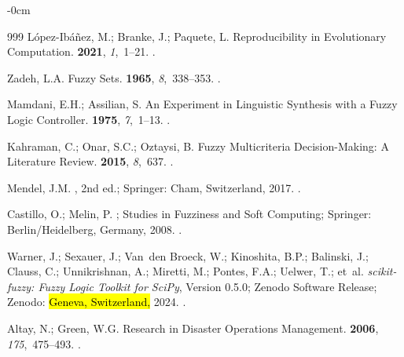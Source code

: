 \documentclass[systems,article,accept,moreauthors,pdftex]{Definitions/mdpi}
\begin{document}
\begin{adjustwidth}{-\extralength}{0cm}
\begin{thebibliography}{999}
L{\'o}pez-Ib{\'a}{\~n}ez, M.; Branke, J.; Paquete, L.
\newblock Reproducibility in Evolutionary Computation.
 {\bf
  2021}, {\em 1},~1--21.
.

Zadeh, L.A.
\newblock Fuzzy Sets.
 {\bf 1965}, {\em 8},~338--353.
.

Mamdani, E.H.; Assilian, S.
\newblock An Experiment in Linguistic Synthesis with a Fuzzy Logic Controller.
 {\bf 1975}, {\em
  7},~1--13.
.

Kahraman, C.; Onar, S.C.; Oztaysi, B.
\newblock Fuzzy Multicriteria Decision-Making: A Literature Review.
  {\bf 2015}, {\em 8},~637.
.

Mendel, J.M.
, 2nd ed.; Springer: Cham, Switzerland,  2017.
.

Castillo, O.; Melin, P.
; Studies in
  Fuzziness and Soft Computing; Springer: Berlin/Heidelberg, Germany,  2008.
.

Warner, J.; Sexauer, J.; Van~den Broeck, W.; Kinoshita, B.P.;  Balinski, J.;  Clauss, C.;  Unnikrishnan, A.; Miretti, M.; Pontes, F.A.;  Uelwer, T.; et~al.
\newblock \emph{{scikit-fuzzy}: Fuzzy Logic Toolkit for {SciPy}}, Version 0.5.0;
\newblock Zenodo Software Release; Zenodo: \hl{Geneva, Switzerland,} %
  2024.
.

Altay, N.; Green, W.G.
 Research in Disaster Operations Management.
 {\bf 2006}, {\em
  175},~475--493.
.


\end{thebibliography}
\end{adjustwidth}
\end{document}
